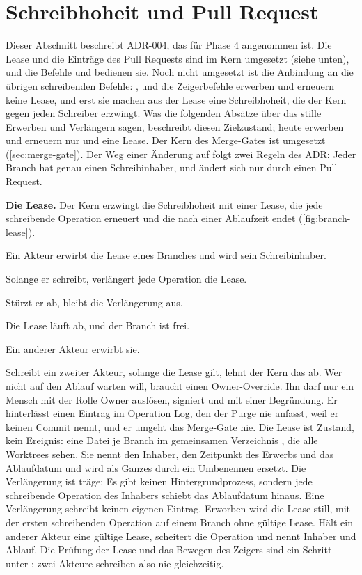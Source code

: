 \section{Schreibhoheit und Pull Request}

Dieser Abschnitt beschreibt ADR-004, das für Phase 4 angenommen ist.
Die Lease und die Einträge des Pull Requests sind im Kern umgesetzt (siehe unten), und die
Befehle  und  bedienen sie.
Noch nicht umgesetzt ist die Anbindung an die übrigen schreibenden Befehle: ,
 und die Zeigerbefehle erwerben und erneuern keine Lease,
und erst sie machen aus der Lease eine Schreibhoheit, die der Kern gegen jeden Schreiber
erzwingt.
Was die folgenden Absätze über das stille Erwerben und Verlängern sagen, beschreibt diesen
Zielzustand; heute erwerben und erneuern nur  und  eine Lease.
Der Kern des Merge-Gates ist umgesetzt ([sec:merge-gate]).
Der Weg einer Änderung auf  folgt zwei Regeln des ADR:
Jeder Branch hat genau einen Schreibinhaber, und  ändert sich nur durch einen Pull
Request.

{\bf Die Lease.}
Der Kern erzwingt die Schreibhoheit mit einer Lease, die jede schreibende Operation erneuert und
die nach einer Ablaufzeit endet ([fig:branch-lease]).

\startitemize[n]
\item Ein Akteur erwirbt die Lease eines Branches und wird sein Schreibinhaber.
\item Solange er schreibt, verlängert jede Operation die Lease.
\item Stürzt er ab, bleibt die Verlängerung aus.
\item Die Lease läuft ab, und der Branch ist frei.
\item Ein anderer Akteur erwirbt sie.
\stopitemize

Schreibt ein zweiter Akteur, solange die Lease gilt, lehnt der Kern das ab.
Wer nicht auf den Ablauf warten will, braucht einen Owner-Override.
Ihn darf nur ein Mensch mit der Rolle Owner auslösen, signiert und mit einer Begründung.
Er hinterlässt einen Eintrag im Operation Log, den der Purge nie anfasst,
weil er keinen Commit nennt, und er umgeht das Merge-Gate nie.
Die Lease ist Zustand, kein Ereignis: eine Datei je Branch im gemeinsamen Verzeichnis
, die alle Worktrees sehen.
Sie nennt den Inhaber, den Zeitpunkt des Erwerbs und das Ablaufdatum
und wird als Ganzes durch ein Umbenennen ersetzt.
Die Verlängerung ist träge: Es gibt keinen Hintergrundprozess, sondern jede schreibende Operation
des Inhabers schiebt das Ablaufdatum hinaus.
Eine Verlängerung schreibt keinen eigenen Eintrag.
Erworben wird die Lease still, mit der ersten schreibenden Operation auf einem Branch ohne gültige
Lease.
Hält ein anderer Akteur eine gültige Lease, scheitert die Operation und nennt Inhaber und Ablauf.
Die Prüfung der Lease und das Bewegen des Zeigers sind ein Schritt unter ;
zwei Akteure schreiben also nie gleichzeitig.

